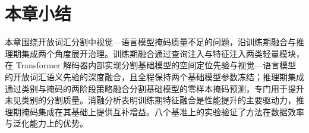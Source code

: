 \section{本章小结}

本章围绕开放词汇分割中视觉—语言模型掩码质量不足的问题，沿训练期融合与推理期集成两个角度展开治理。训练期融合通过查询注入与特征注入两类轻量模块，在 Transformer 解码器内部实现分割基础模型的空间定位先验与视觉—语言模型的开放词汇语义先验的深度融合，且全程保持两个基础模型参数冻结；推理期集成通过类别与掩码的两阶段策略融合分割基础模型的零样本掩码预测，专门用于提升未见类别的分割质量。消融分析表明训练期特征融合是性能提升的主要驱动力，推理期掩码集成在其基础上提供互补增益。八个基准上的实验验证了方法在数据效率与泛化能力上的优势。

